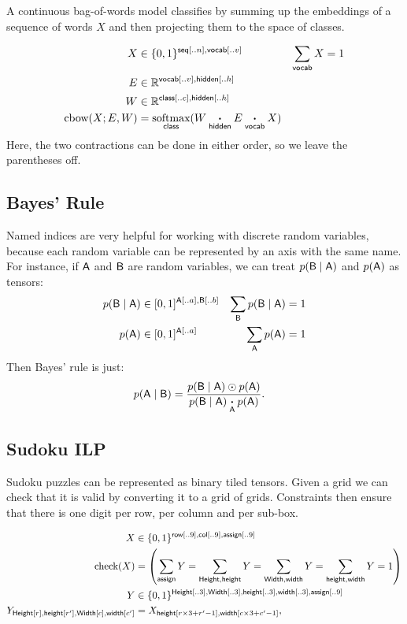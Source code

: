 \documentclass{article}
\newcommand{\reals}{\mathbb{R}}
\begin{document}
A continuous bag-of-words model classifies by summing up the embeddings of a sequence of words $X$ and then projecting them to the space of classes. 

\begin{align*} 
X &\in \{0, 1\}^{{\nset{seq}{..n}, \nset{vocab}{..v}}} & \nsum{vocab} X &= 1\\
E &\in \reals^{{\nset{vocab}{..v}, \nset{hidden}{..h}}}\\
W &\in \reals^{{\nset{class}{..c}, \nset{hidden}{..h}}}\\
\text{cbow}(X; E, W) &= \nfun{class}{softmax} (W \ndot{hidden} E \ndot{vocab} X)
\end{align*}
Here, the two contractions can be done in either order, so we leave the parentheses off.

\subsection{Bayes' Rule}

Named indices are very helpful for working with discrete random variables, because each random variable can be represented by an axis with the same name. For instance, if $\mathsf{A}$ and $\mathsf{B}$ are random variables, we can treat $p(\mathsf{B} \mid \mathsf{A})$ and $p(\mathsf{A})$ as tensors:
\begin{align*} 
p(\mathsf{B} \mid \mathsf{A}) &\in [0, 1]^{\mathsf{A}[..a], \mathsf{B}[..b]} & \sum\limits_{\mathsf{B}} p(\mathsf{B}\mid \mathsf{A}) &= 1 \\
p(\mathsf{A}) &\in [0, 1]^{\mathsf{A}[..a]} & \sum\limits_{\mathsf{A}} p(\mathsf{A}) &= 1
\end{align*}
Then Bayes' rule is just:
\begin{align*}
p(\mathsf{A} \mid \mathsf{B}) &= \frac{p(\mathsf{B} \mid \mathsf{A}) \odot p(\mathsf{A})}{p(\mathsf{B} \mid \mathsf{A}) \mathbin{\mathop{\boldsymbol\cdot}\limits_{\mathsf{A}}} p(\mathsf{A})}.
\end{align*}

\subsection{Sudoku ILP}

Sudoku puzzles can be represented as  binary tiled tensors.
Given a grid we can check that it is valid by converting it to a grid of grids. 
Constraints then ensure that there is one digit per row, per column and per sub-box. 

\begin{align*} 
X &\in \{0, 1\}^{\mathsf{row}[..9], \mathsf{col}[..9], \mathsf{assign}[..9]}  \\
\text{check}(X) &=
\left(\sum\limits_{\mathsf{assign}} Y = 
\sum\limits_{\mathsf{Height, height}} Y = 
\sum\limits_{\mathsf{Width, width}} Y =  
\sum\limits_{\mathsf{height, width}} Y = 1 \right) \\
Y &\in \{0, 1\}^{\mathsf{Height}[..3], \mathsf{Width}[..3], \mathsf{height}[..3], \mathsf{width}[..3], \mathsf{assign}[..9]}  \\
Y_{\mathsf{Height}[r], \mathsf{height}[r'], \mathsf{Width}[c], \mathsf{width}[c']} &= X_{\mathsf{height}[r\times 3 + r'-1], \mathsf{width}[c\times3 + c'-1]}, 
\end{align*} 
\end{document}
